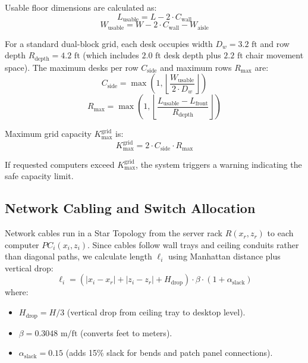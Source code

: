 \documentclass[conference]{IEEEtran}
\begin{document}
Usable floor dimensions are calculated as:
\begin{equation}
L_{\text{usable}} = L - 2 \cdot C_{\text{wall}}
\end{equation}
\begin{equation}
W_{\text{usable}} = W - 2 \cdot C_{\text{wall}} - W_{\text{aisle}}
\end{equation}

For a standard dual-block grid, each desk occupies width $D_w = 3.2\text{ ft}$ and row depth $R_{\text{depth}} = 4.2\text{ ft}$ (which includes $2.0\text{ ft}$ desk depth plus $2.2\text{ ft}$ chair movement space). The maximum desks per row $C_{\text{side}}$ and maximum rows $R_{\text{max}}$ are:
\begin{equation}
C_{\text{side}} = \max\left(1, \left\lfloor \frac{W_{\text{usable}}}{2 \cdot D_w} \right\rfloor\right)
\end{equation}
\begin{equation}
R_{\text{max}} = \max\left(1, \left\lfloor \frac{L_{\text{usable}} - L_{\text{front}}}{R_{\text{depth}}} \right\rfloor\right)
\end{equation}

Maximum grid capacity $K_{\text{max}}^{\text{grid}}$ is:
\begin{equation}
K_{\text{max}}^{\text{grid}} = 2 \cdot C_{\text{side}} \cdot R_{\text{max}}
\end{equation}

If requested computers exceed $K_{\text{max}}^{\text{grid}}$, the system triggers a warning indicating the safe capacity limit.

\subsection{Network Cabling and Switch Allocation}
Network cables run in a Star Topology from the server rack $R(x_r, z_r)$ to each computer $PC_i(x_i, z_i)$. Since cables follow wall trays and ceiling conduits rather than diagonal paths, we calculate length $\ell_i$ using Manhattan distance plus vertical drop:
\begin{equation}
\ell_i = \left( |x_i - x_r| + |z_i - z_r| + H_{\text{drop}} \right) \cdot \beta \cdot (1 + \alpha_{\text{slack}})
\end{equation}
where:
\begin{itemize}
    \item $H_{\text{drop}} = H / 3$ (vertical drop from ceiling tray to desktop level).
    \item $\beta = 0.3048\text{ m/ft}$ (converts feet to meters).
    \item $\alpha_{\text{slack}} = 0.15$ (adds 15\% slack for bends and patch panel connections).
\end{itemize}
\end{document}

